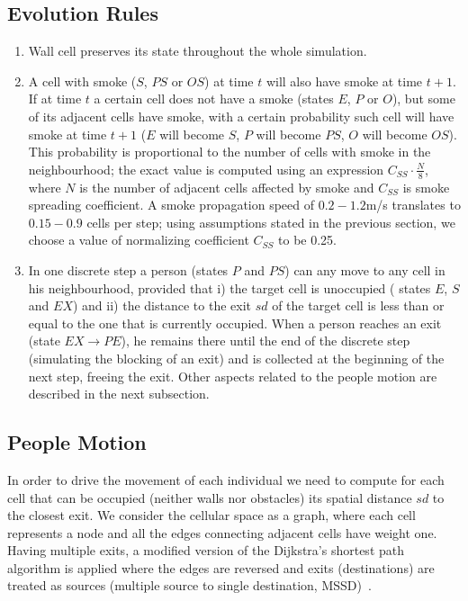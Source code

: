 \subsection{Evolution Rules}
\begin{enumerate}
    \item Wall cell preserves its state throughout the whole simulation.

    \item A cell with smoke ($S$, $PS$ or $OS$) at time $t$ will also have smoke at 
    time $t+1$. If at time $t$ a certain cell does not have a smoke (states $E$, $P$ 
    or $O$), but some of its adjacent cells have smoke, with a certain probability 
    such cell will have smoke at time $t+1$ ($E$ will become $S$, $P$ will become
    $PS$, $O$ will become $OS$). This probability is proportional to the number of 
    cells with smoke in the neighbourhood; the exact value is computed using an 
    expression $C_{SS} \cdot \frac{N}{8}$, where $N$ is the number of adjacent cells 
    affected by smoke and $C_{SS}$ is smoke spreading coefficient. A smoke 
    propagation speed of $0.2-1.2$m/s translates to $0.15-0.9$ cells per step; 
    using assumptions stated in the previous section, we choose a value of 
    normalizing coefficient $C_{SS}$ to be 0.25. 
    
    \item In one discrete step a person (states $P$ and $PS$) can any move to any 
    cell in his neighbourhood, provided that i) the target cell is unoccupied (
    states $E$, $S$ and $EX$) and ii) the distance to the exit $sd$ of the target 
    cell is less than or equal to the one that is currently occupied. When a person 
    reaches an exit (state $EX \rightarrow PE$), he remains there until the end of 
    the discrete step (simulating the blocking of an exit) and is collected at the 
    beginning of the next step, freeing the exit. Other aspects related to the 
    people motion are described in the next subsection.
\end{enumerate}

\subsection{People Motion}
In order to drive the movement of each individual we need to compute for each cell 
that can be occupied (neither walls nor obstacles) its spatial distance $sd$ to the closest exit.
We consider the cellular space as a graph, where each cell represents a node and all 
the edges connecting adjacent cells have weight one.
Having multiple exits, a modified version of the Dijkstra's shortest path algorithm 
is applied where the edges are reversed and exits (destinations) are treated as 
sources (multiple source to single destination, MSSD)~\cite{Dijkstra}.

